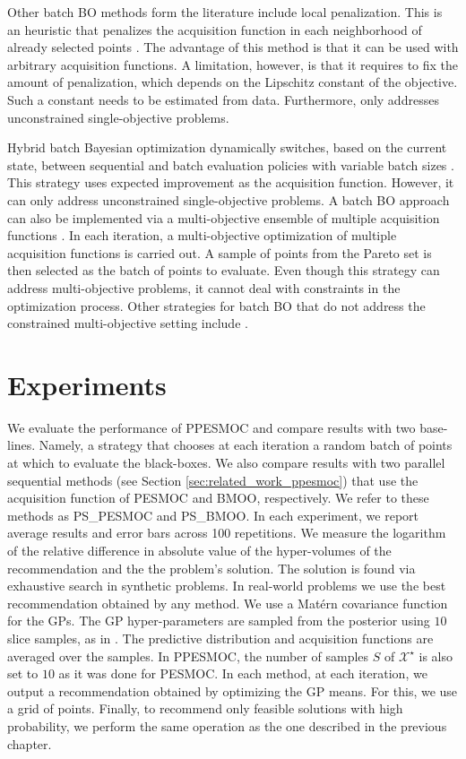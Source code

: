 Other batch BO methods form the literature include local penalization. This is 
an heuristic that penalizes the acquisition function in each neighborhood of 
already selected points \citep{gonzalez2016batch}. The advantage of this method is 
that it can be used with arbitrary acquisition functions. A limitation, however, 
is that it requires to fix the amount of penalization, which depends on the 
Lipschitz constant of the objective.  Such a constant needs to be estimated from data. 
Furthermore, \cite{gonzalez2016batch} only addresses 
unconstrained single-objective problems.

Hybrid batch Bayesian optimization dynamically switches, based on the current 
state, between sequential and batch evaluation policies with 
variable batch sizes \citep{azimi2012hybrid}. This strategy uses expected improvement as the 
acquisition function. However, it can only address unconstrained single-objective 
problems. A batch BO approach can also be implemented via a multi-objective ensemble  of multiple acquisition 
functions \citep{lyu2018batch}. In each iteration, a multi-objective optimization of multiple 
acquisition functions is carried out. A sample of points from the Pareto set is then selected 
as the batch of points to evaluate. Even though this strategy can address multi-objective problems, 
it cannot deal with constraints in the optimization process. Other strategies for batch 
BO that do not address the constrained multi-objective setting 
include \citep{desautels2014parallelizing,gupta2018exploiting,kathuria2016batched,daxberger2017distributed}.

\section{Experiments}\label{seq_experiments}

We evaluate the performance of PPESMOC and
compare results with two base-lines. Namely, a strategy that  chooses 
at each iteration a random batch of points at which to evaluate the 
black-boxes. We also compare results with two parallel sequential methods (see
Section \ref{sec:related_work_ppesmoc}) that use the acquisition function of 
PESMOC and BMOO, respectively. We refer to these methods as PS\_PESMOC and 
PS\_BMOO. In each experiment, we report average results and error bars 
across 100 repetitions. We measure the logarithm of the relative difference 
in absolute value of the hyper-volumes of the recommendation and the 
the problem's solution. The solution is found via exhaustive search in 
synthetic problems. In real-world problems we use the best recommendation obtained 
by any method. We use a Mat\'ern covariance function for the GPs. The GP 
hyper-parameters are sampled from the posterior using $10$ 
slice samples, as in \citep{snoek2012practical}. The predictive distribution 
and acquisition functions are averaged over the samples.
In PPESMOC, the number of samples $S$ of $\mathcal{X}^\star$ is also set to 
$10$ as it was done for PESMOC. 
In each method, at each iteration, we output a recommendation obtained by 
optimizing the GP means. For this, we use a grid of points. Finally, to 
recommend only feasible solutions with high probability, we perform the same operation as the one described in the previous chapter. 


